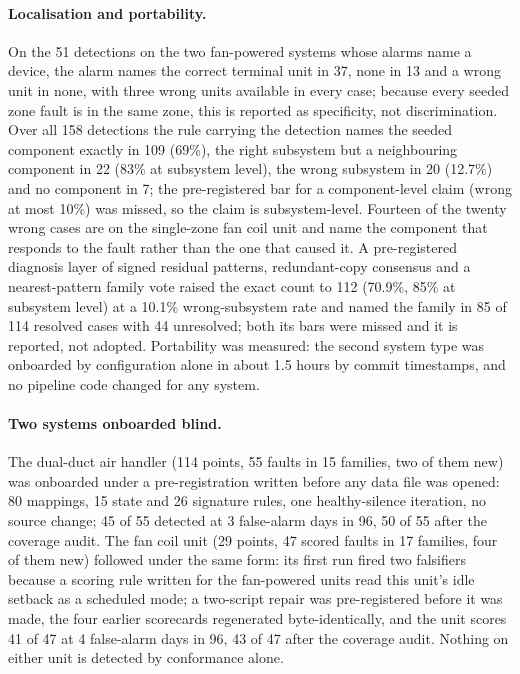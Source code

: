 \documentclass[11pt,letterpaper]{article}
\begin{document}
\paragraph{Localisation and portability.} On the 51 detections on the two fan-powered systems whose alarms name a device, the alarm names the correct terminal unit in 37, none in 13 and a wrong unit in none, with three wrong units available in every case; because every seeded zone fault is in the same zone, this is reported as specificity, not discrimination. Over all 158 detections the rule carrying the detection names the seeded component exactly in 109 (69\%), the right subsystem but a neighbouring component in 22 (83\% at subsystem level), the wrong subsystem in 20 (12.7\%) and no component in 7; the pre-registered bar for a component-level claim (wrong at most 10\%) was missed, so the claim is subsystem-level. Fourteen of the twenty wrong cases are on the single-zone fan coil unit and name the component that responds to the fault rather than the one that caused it. A pre-registered diagnosis layer of signed residual patterns, redundant-copy consensus and a nearest-pattern family vote raised the exact count to 112 (70.9\%, 85\% at subsystem level) at a 10.1\% wrong-subsystem rate and named the family in 85 of 114 resolved cases with 44 unresolved; both its bars were missed and it is reported, not adopted. Portability was measured: the second system type was onboarded by configuration alone in about 1.5 hours by commit timestamps, and no pipeline code changed for any system.

\paragraph{Two systems onboarded blind.} The dual-duct air handler (114 points, 55 faults in 15 families, two of them new) was onboarded under a pre-registration written before any data file was opened: 80 mappings, 15 state and 26 signature rules, one healthy-silence iteration, no source change; 45 of 55 detected at 3 false-alarm days in 96, 50 of 55 after the coverage audit. The fan coil unit (29 points, 47 scored faults in 17 families, four of them new) followed under the same form: its first run fired two falsifiers because a scoring rule written for the fan-powered units read this unit's idle setback as a scheduled mode; a two-script repair was pre-registered before it was made, the four earlier scorecards regenerated byte-identically, and the unit scores 41 of 47 at 4 false-alarm days in 96, 43 of 47 after the coverage audit. Nothing on either unit is detected by conformance alone.
\end{document}
